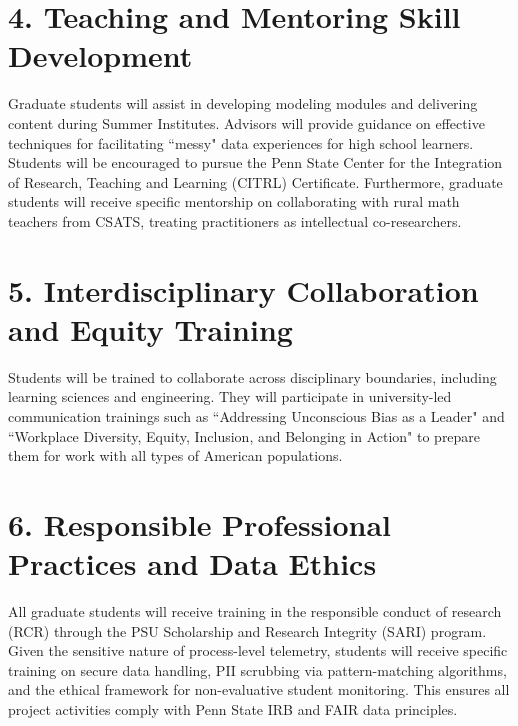 \documentclass[11pt]{article}
\begin{document}
\section*{4. Teaching and Mentoring Skill Development}
Graduate students will assist in developing modeling modules and delivering content during Summer Institutes. Advisors will provide guidance on effective techniques for facilitating ``messy" data experiences for high school learners. Students will be encouraged to pursue the Penn State Center for the Integration of Research, Teaching and Learning (CITRL) Certificate. Furthermore, graduate students will receive specific mentorship on collaborating with rural math teachers from CSATS, treating practitioners as intellectual co-researchers.

\section*{5. Interdisciplinary Collaboration and Equity Training}
Students will be trained to collaborate across disciplinary boundaries, including learning sciences and engineering. They will participate in university-led communication trainings such as ``Addressing Unconscious Bias as a Leader" and ``Workplace Diversity, Equity, Inclusion, and Belonging in Action" to prepare them for work with all types of American populations.

\section*{6. Responsible Professional Practices and Data Ethics}
All graduate students will receive training in the responsible conduct of research (RCR) through the PSU Scholarship and Research Integrity (SARI) program. Given the sensitive nature of process-level telemetry, students will receive specific training on secure data handling, PII scrubbing via pattern-matching algorithms, and the ethical framework for non-evaluative student monitoring. This ensures all project activities comply with Penn State IRB and FAIR data principles.
\end{document}
